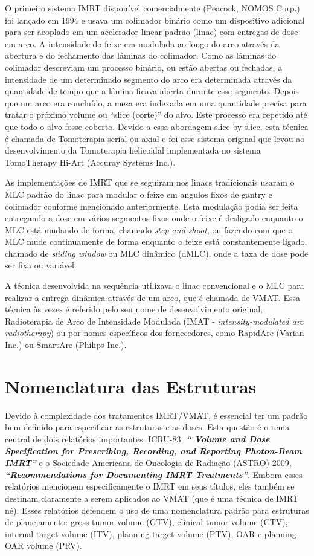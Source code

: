 \documentclass[11pt,a4paper]{article}
\begin{document}
	O primeiro sistema IMRT disponível comercialmente (Peacock, NOMOS Corp.) foi lançado em 1994 e usava um colimador binário como um dispositivo adicional para ser acoplado em um acelerador linear padrão (linac) com entregas de dose em arco. A intensidade do feixe era modulada ao longo do arco através da abertura e do fechamento das lâminas do colimador. Como as lâminas do colimador descreviam um processo binário, ou estão abertas ou fechadas, a intensidade de um determinado segmento do arco era determinada através da quantidade de tempo que a lâmina ficava aberta durante esse segmento. Depois que um arco era concluído, a mesa era indexada em uma quantidade precisa para tratar o próximo volume ou ``slice (corte)'' do alvo. Este processo era repetido até que todo o alvo fosse coberto. Devido a essa abordagem slice-by-slice, esta técnica é chamada de Tomoterapia serial ou axial e foi esse sistema original que levou ao desenvolvimento da Tomoterapia helicoidal implementada no sistema TomoTherapy Hi-Art (Accuray Systems Inc.). 

	As implementações de IMRT que se seguiram nos linacs tradicionais usaram o MLC padrão do linac para modular o feixe em angulos fixos de gantry e colimador conforme mencionado anteriormente. Esta modulação podia ser feita entregando a dose em vários segmentos fixos onde o feixe é desligado enquanto o MLC está mudando de forma, chamado \textit{step-and-shoot}, ou fazendo com que o MLC mude continuamente de forma enquanto o feixe está constantemente ligado, chamado de \textit{sliding window} ou MLC dinâmico (dMLC), onde a taxa de dose pode ser fixa ou variável. 

	A técnica desenvolvida na sequência utilizava o linac convencional e o MLC para realizar a entrega dinâmica através de um arco,  que é chamada de VMAT. Essa técnica às vezes é referido pelo seu nome de desenvolvimento original, Radioterapia de Arco de Intensidade Modulada  (IMAT - \textit{intensity-modulated arc radiotherapy}) ou por nomes específicos dos fornecedores, como RapidArc (Varian Inc.) ou SmartArc (Philips Inc.).

\section{Nomenclatura das Estruturas}

	Devido à complexidade dos tratamentos IMRT/VMAT, é essencial ter um padrão bem definido para especificar as estruturas e as doses. Esta questão é o tema central de dois relatórios importantes: ICRU-83, \textbf{\textit{`` Volume and Dose Specification for Prescribing, Recording, and Reporting Photon-Beam IMRT''}} e o Sociedade Americana de Oncologia de Radiação (ASTRO) 2009, \textbf{\textit{``Recommendations for Documenting IMRT Treatments''}}. Embora esses relatórios mencionem especificamente o IMRT em seus títulos, eles também se destinam claramente a serem aplicados ao VMAT (que é uma técnica de IMRT né). Esses relatórios defendem o uso de uma nomenclatura padrão para estruturas de planejamento: gross tumor volume (GTV), clinical tumor volume (CTV), internal target volume (ITV), planning target volume (PTV), OAR e planning OAR volume (PRV).
\end{document}
